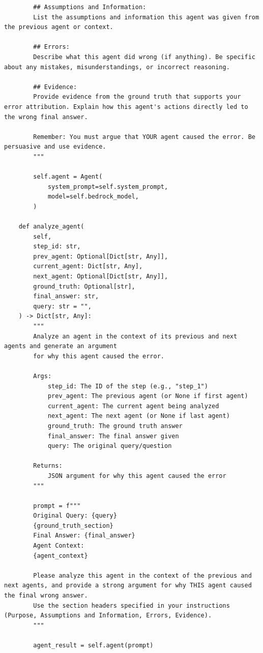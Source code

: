 \documentclass{article}
\begin{document}
\begin{lstlisting}
        ## Assumptions and Information:
        List the assumptions and information this agent was given from the previous agent or context.
        
        ## Errors:
        Describe what this agent did wrong (if anything). Be specific about any mistakes, misunderstandings, or incorrect reasoning.
        
        ## Evidence:
        Provide evidence from the ground truth that supports your error attribution. Explain how this agent's actions directly led to the wrong final answer.
        
        Remember: You must argue that YOUR agent caused the error. Be persuasive and use evidence.
        """

        self.agent = Agent(
            system_prompt=self.system_prompt,
            model=self.bedrock_model,
        )

    def analyze_agent(
        self,
        step_id: str,
        prev_agent: Optional[Dict[str, Any]],
        current_agent: Dict[str, Any],
        next_agent: Optional[Dict[str, Any]],
        ground_truth: Optional[str],
        final_answer: str,
        query: str = "",
    ) -> Dict[str, Any]:
        """
        Analyze an agent in the context of its previous and next agents and generate an argument
        for why this agent caused the error.

        Args:
            step_id: The ID of the step (e.g., "step_1")
            prev_agent: The previous agent (or None if first agent)
            current_agent: The current agent being analyzed
            next_agent: The next agent (or None if last agent)
            ground_truth: The ground truth answer
            final_answer: The final answer given
            query: The original query/question

        Returns:
            JSON argument for why this agent caused the error
        """

        prompt = f"""
        Original Query: {query}
        {ground_truth_section}
        Final Answer: {final_answer}
        Agent Context:
        {agent_context}
        
        Please analyze this agent in the context of the previous and next agents, and provide a strong argument for why THIS agent caused the final wrong answer.
        Use the section headers specified in your instructions (Purpose, Assumptions and Information, Errors, Evidence).
        """

        agent_result = self.agent(prompt)


\end{lstlisting}
\end{document}
